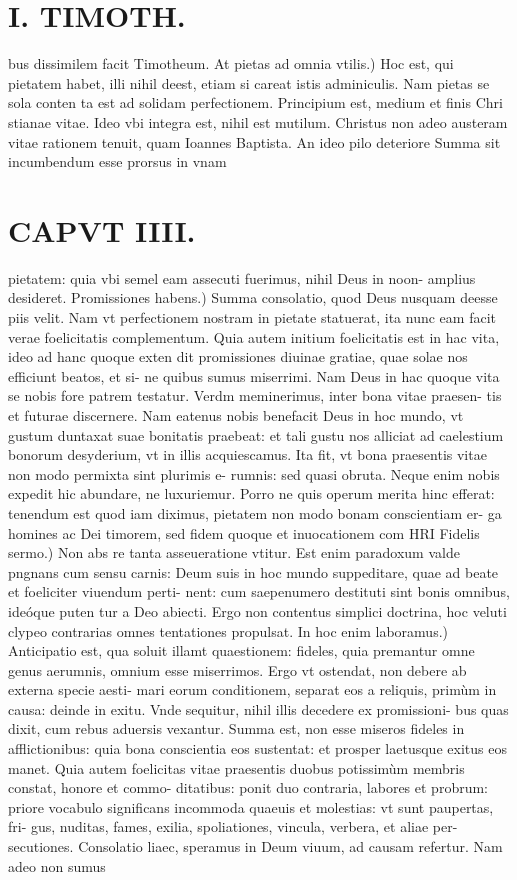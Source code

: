 \documentclass{article}
\begin{document}
\begin{pages}
\section*{I. TIMOTH. }
\marginpar{[ p.50 ]}\pstart bus dissimilem facit Timotheum.  \pend\pstart At pietas ad omnia vtilis.) Hoc est, qui pietatem habet, illi nihil deest, etiam si careat istis adminiculis. Nam pietas se sola conten ta est ad solidam perfectionem. Principium est, medium et finis Chri stianae vitae. Ideo vbi integra est, nihil est mutilum. Christus non adeo austeram vitae rationem tenuit, quam Ioannes Baptista. An ideo pilo deteriore Summa sit incumbendum esse prorsus in vnam  \pend
\section*{CAPVT IIII. }
\marginpar{[ p.51 ]}\pstart pietatem: quia vbi semel eam assecuti fuerimus, nihil Deus in noon- amplius desideret.  \pend\pstart Promissiones habens.) Summa consolatio, quod Deus nusquam deesse piis velit. Nam vt perfectionem nostram in pietate statuerat, ita nunc eam facit verae foelicitatis complementum. Quia autem initium foelicitatis est in hac vita, ideo ad hanc quoque exten dit promissiones diuinae gratiae, quae solae nos efficiunt beatos, et si- ne quibus sumus miserrimi. Nam Deus in hac quoque vita se nobis fore patrem testatur. Verdm meminerimus, inter bona vitae praesen- tis et futurae discernere. Nam eatenus nobis benefacit Deus in hoc mundo, vt gustum duntaxat suae bonitatis praebeat: et tali gustu nos alliciat ad caelestium bonorum desyderium, vt in illis acquiescamus. Ita fit, vt bona praesentis vitae non modo permixta sint plurimis e- rumnis: sed quasi obruta. Neque enim nobis expedit hic abundare, ne luxuriemur. Porro ne quis operum merita hinc efferat: tenendum est quod iam diximus, pietatem non modo bonam conscientiam er- ga homines ac Dei timorem, sed fidem quoque et inuocationem com  \pend\pstart HRI Fidelis sermo.) Non abs re tanta asseueratione vtitur. Est enim paradoxum valde pngnans cum sensu carnis: Deum suis in hoc mundo suppeditare, quae ad beate et foeliciter viuendum perti- nent: cum saepenumero destituti sint bonis omnibus, ideóque puten tur a Deo abiecti. Ergo non contentus simplici doctrina, hoc veluti clypeo contrarias omnes tentationes propulsat.  \pend\pstart In hoc enim laboramus.) Anticipatio est, qua soluit illamt quaestionem: fideles, quia premantur omne genus aerumnis, omnium esse miserrimos. Ergo vt ostendat, non debere ab externa specie aesti- mari eorum conditionem, separat eos a reliquis, primùm in causa: deinde in exitu. Vnde sequitur, nihil illis decedere ex promissioni- bus quas dixit, cum rebus aduersis vexantur. Summa est, non esse miseros fideles in afflictionibus: quia bona conscientia eos sustentat: et prosper laetusque exitus eos manet. Quia autem foelicitas vitae praesentis duobus potissimùm membris constat, honore et commo- ditatibus: ponit duo contraria, labores et probrum: priore vocabulo significans incommoda quaeuis et molestias: vt sunt paupertas, fri- gus, nuditas, fames, exilia, spoliationes, vincula, verbera, et aliae per- secutiones. Consolatio liaec, speramus in Deum viuum, ad causam refertur. Nam adeo non sumus 
\end{pages}
\end{document}
